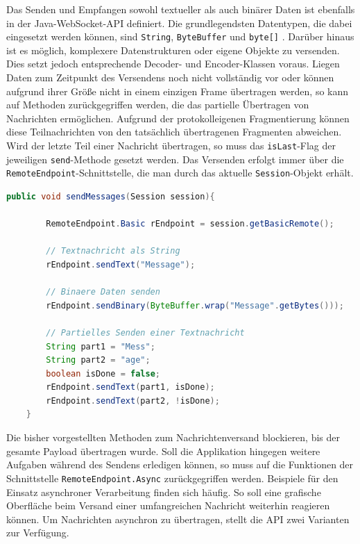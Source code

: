 \documentclass[11pt,a4paper,titlepage]{scrartcl}
\numberwithin{equation}{section}
\begin{document}
\noindent Das Senden und Empfangen sowohl textueller als auch binärer Daten ist ebenfalls in der Java-WebSocket-API definiert. Die grundlegendsten Datentypen, die dabei eingesetzt werden können, sind \texttt{String}, \texttt{ByteBuffer} und \texttt{byte[]} \autocite[30]{coward_java_2014}. Darüber hinaus ist es möglich, komplexere Datenstrukturen oder eigene Objekte zu versenden. Dies setzt jedoch entsprechende Decoder- und Encoder-Klassen voraus. Liegen Daten zum Zeitpunkt des Versendens noch nicht vollständig vor oder können aufgrund ihrer Größe nicht in einem einzigen Frame übertragen werden, so kann auf Methoden zurückgegriffen werden, die das partielle Übertragen von Nachrichten ermöglichen. Aufgrund der protokolleigenen Fragmentierung können diese Teilnachrichten von den tatsächlich übertragenen Fragmenten abweichen. Wird der letzte Teil einer Nachricht übertragen, so muss das \texttt{isLast}-Flag der jeweiligen \texttt{send}-Methode gesetzt werden. Das Versenden erfolgt immer über die \texttt{RemoteEndpoint}-Schnittstelle, die man durch das aktuelle \texttt{Session}-Objekt erhält. \\

\begin{lstlisting}[frame=single, language=Java, caption=Java: synchrone Nachrichtenübertragung]
	public void sendMessages(Session session){
	
		RemoteEndpoint.Basic rEndpoint = session.getBasicRemote();
		
		// Textnachricht als String
		rEndpoint.sendText("Message");
		
		// Binaere Daten senden
		rEndpoint.sendBinary(ByteBuffer.wrap("Message".getBytes()));
		
		// Partielles Senden einer Textnachricht
		String part1 = "Mess";
		String part2 = "age";
		boolean isDone = false;
		rEndpoint.sendText(part1, isDone);
		rEndpoint.sendText(part2, !isDone);
	}
\end{lstlisting}

\noindent Die bisher vorgestellten Methoden zum Nachrichtenversand blockieren, bis der gesamte Payload übertragen wurde. Soll die Applikation hingegen weitere Aufgaben während des Sendens erledigen können, so muss auf die Funktionen der Schnittstelle \texttt{RemoteEndpoint.Async} zurückgegriffen werden. Beispiele für den Einsatz asynchroner Verarbeitung finden sich häufig. So soll eine grafische Oberfläche beim Versand einer umfangreichen Nachricht weiterhin reagieren können. Um Nachrichten asynchron zu übertragen, stellt die API zwei Varianten zur Verfügung. \\
\end{document}
